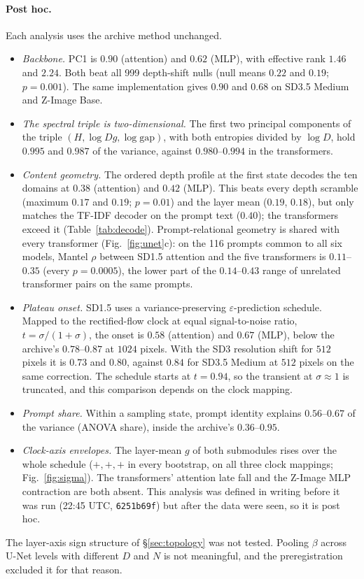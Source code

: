 \documentclass[11pt]{article}
\newcommand{\gap}{\mathrm{gap}}
\begin{document}
\paragraph{Post hoc.} Each analysis uses the archive method unchanged.
\begin{itemize}
 \item \emph{Backbone.} PC1 is $0.90$ (attention) and $0.62$ (MLP), with effective rank $1.46$ and $2.24$. Both beat all 999 depth-shift nulls (null means $0.22$ and $0.19$; $p=0.001$). The same implementation gives $0.90$ and $0.68$ on SD3.5 Medium and Z-Image Base.
 \item \emph{The spectral triple is two-dimensional.} The first two principal components of the triple $(H,\log Dg,\log\gap)$, with both entropies divided by $\log D$, hold $0.995$ and $0.987$ of the variance, against $0.980$--$0.994$ in the transformers.
 \item \emph{Content geometry.} The ordered depth profile at the first state decodes the ten domains at $0.38$ (attention) and $0.42$ (MLP). This beats every depth scramble (maximum $0.17$ and $0.19$; $p=0.01$) and the layer mean ($0.19$, $0.18$), but only matches the TF-IDF decoder on the prompt text ($0.40$); the transformers exceed it (Table~\ref{tab:decode}). Prompt-relational geometry is shared with every transformer (Fig.~\ref{fig:unet}c): on the 116 prompts common to all six models, Mantel $\rho$ between SD1.5 attention and the five transformers is $0.11$--$0.35$ (every $p=0.0005$), the lower part of the $0.14$--$0.43$ range of unrelated transformer pairs on the same prompts.
 \item \emph{Plateau onset.} SD1.5 uses a variance-preserving $\varepsilon$-prediction schedule. Mapped to the rectified-flow clock at equal signal-to-noise ratio, $t=\sigma/(1+\sigma)$, the onset is $0.58$ (attention) and $0.67$ (MLP), below the archive's $0.78$--$0.87$ at $1024$ pixels. With the SD3 resolution shift for $512$ pixels it is $0.73$ and $0.80$, against $0.84$ for SD3.5 Medium at $512$ pixels on the same correction. The schedule starts at $t=0.94$, so the transient at $\sigma\approx1$ is truncated, and this comparison depends on the clock mapping.
 \item \emph{Prompt share.} Within a sampling state, prompt identity explains $0.56$--$0.67$ of the variance (ANOVA share), inside the archive's $0.36$--$0.95$.
 \item \emph{Clock-axis envelopes.} The layer-mean $g$ of both submodules rises over the whole schedule ($+,+,+$ in every bootstrap, on all three clock mappings; Fig.~\ref{fig:sigma}). The transformers' attention late fall and the Z-Image MLP contraction are both absent. This analysis was defined in writing before it was run (22:45 UTC, \texttt{6251b69f}) but after the data were seen, so it is post hoc.
\end{itemize}
The layer-axis sign structure of \S\ref{sec:topology} was not tested. Pooling $\beta$ across U-Net levels with different $D$ and $N$ is not meaningful, and the preregistration excluded it for that reason.
\end{document}
